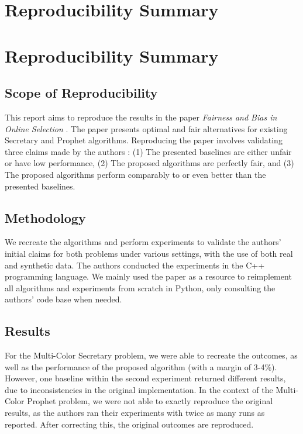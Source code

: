 \section{Reproducibility Summary}

\section*{\centering Reproducibility Summary}

\subsection*{Scope of Reproducibility}
This report aims to reproduce the results in the paper \textit{Fairness and Bias in Online Selection} \cite{correa21}. The paper presents optimal and fair alternatives for existing Secretary and Prophet algorithms. Reproducing the paper involves validating three claims made by the authors \cite{correa21}: (1) The presented baselines are either unfair or have low performance, (2) The proposed algorithms are perfectly fair, and (3) The proposed algorithms perform comparably to or even better than the presented baselines.

\subsection*{Methodology}

We recreate the algorithms and perform experiments to validate the authors' initial claims for both problems under various settings, with the use of both real and synthetic data. The authors conducted the experiments in the C++ programming language. We mainly used the paper as a resource to reimplement all algorithms and experiments from scratch in Python, only consulting the authors' code base when needed.

\subsection*{Results}

For the Multi-Color Secretary problem, we were able to recreate the outcomes, as well as the performance of the proposed algorithm (with a margin of 3-4\%). However, one baseline within the second experiment returned different results, due to inconsistencies in the original implementation. In the context of the Multi-Color Prophet problem, we were not able to exactly reproduce the original results, as the authors ran their experiments with twice as many runs as reported. After correcting this, the original outcomes are reproduced.

